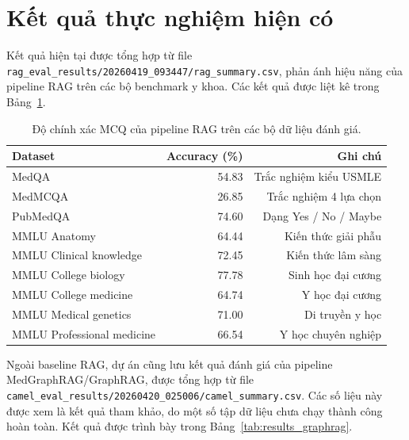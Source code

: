 \documentclass[a4paper,12pt,twoside]{report}
\begin{document}
\section{Kết quả thực nghiệm hiện có}
Kết quả hiện tại được tổng hợp từ file \texttt{rag\_eval\_results/20260419\_093447/rag\_summary.csv}, phản ánh hiệu năng của pipeline RAG trên các bộ benchmark y khoa. Các kết quả được liệt kê trong Bảng~\ref{tab:results_rag}.

\begin{table}[H]
  \centering
  \caption{Độ chính xác MCQ của pipeline RAG trên các bộ dữ liệu đánh giá.}
  \label{tab:results_rag}
  \begin{tabular}{@{}lrr@{}}
    \toprule
    \textbf{Dataset} & \textbf{Accuracy (\%)} & \textbf{Ghi chú} \\
    \midrule
    MedQA & 54.83 & Trắc nghiệm kiểu USMLE \\
    MedMCQA & 26.85 & Trắc nghiệm 4 lựa chọn \\
    PubMedQA & 74.60 & Dạng Yes / No / Maybe \\
    MMLU Anatomy & 64.44 & Kiến thức giải phẫu \\
    MMLU Clinical knowledge & 72.45 & Kiến thức lâm sàng \\
    MMLU College biology & 77.78 & Sinh học đại cương \\
    MMLU College medicine & 64.74 & Y học đại cương \\
    MMLU Medical genetics & 71.00 & Di truyền y học \\
    MMLU Professional medicine & 66.54 & Y học chuyên nghiệp \\
    \bottomrule
  \end{tabular}
\end{table}

Ngoài baseline RAG, dự án cũng lưu kết quả đánh giá của pipeline MedGraphRAG/GraphRAG, được tổng hợp từ file \texttt{camel\_eval\_results/20260420\_025006/camel\_summary.csv}. Các số liệu này được xem là kết quả tham khảo, do một số tập dữ liệu chưa chạy thành công hoàn toàn. Kết quả được trình bày trong Bảng~\ref{tab:results_graphrag}.
\end{document}
